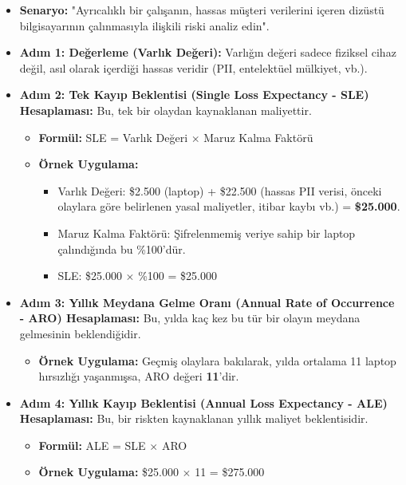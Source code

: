 \begin{itemize}
    \item \textbf{Senaryo:} "Ayrıcalıklı bir çalışanın, hassas müşteri verilerini içeren dizüstü bilgisayarının çalınmasıyla ilişkili riski analiz edin".
    \item \textbf{Adım 1: Değerleme (Varlık Değeri):} Varlığın değeri sadece fiziksel cihaz değil, asıl olarak içerdiği hassas veridir (PII, entelektüel mülkiyet, vb.).
    \item \textbf{Adım 2: Tek Kayıp Beklentisi (Single Loss Expectancy - SLE) Hesaplaması:} Bu, tek bir olaydan kaynaklanan maliyettir.
    \begin{itemize}
        \item \textbf{Formül:} SLE = Varlık Değeri $\times$ Maruz Kalma Faktörü
        \item \textbf{Örnek Uygulama:}
        \begin{itemize}
            \item Varlık Değeri: \$2.500 (laptop) + \$22.500 (hassas PII verisi, önceki olaylara göre belirlenen yasal maliyetler, itibar kaybı vb.) = \textbf{\$25.000}.
            \item Maruz Kalma Faktörü: Şifrelenmemiş veriye sahip bir laptop çalındığında bu \%100'dür.
            \item SLE: \$25.000 $\times$ \%100 = \$25.000
        \end{itemize}
    \end{itemize}
    \item \textbf{Adım 3: Yıllık Meydana Gelme Oranı (Annual Rate of Occurrence - ARO) Hesaplaması:} Bu, yılda kaç kez bu tür bir olayın meydana gelmesinin beklendiğidir.
    \begin{itemize}
        \item \textbf{Örnek Uygulama:} Geçmiş olaylara bakılarak, yılda ortalama 11 laptop hırsızlığı yaşanmışsa, ARO değeri \textbf{11}'dir.
    \end{itemize}
    \item \textbf{Adım 4: Yıllık Kayıp Beklentisi (Annual Loss Expectancy - ALE) Hesaplaması:} Bu, bir riskten kaynaklanan yıllık maliyet beklentisidir.
    \begin{itemize}
        \item \textbf{Formül:} ALE = SLE $\times$ ARO
        \item \textbf{Örnek Uygulama:} \$25.000 $\times$ 11 = \$275.000
    \end{itemize}
\end{itemize}

